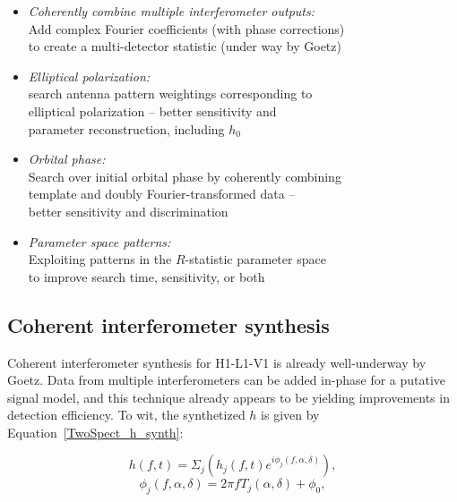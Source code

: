 \begin{itemize}
\item \emph{Coherently combine multiple interferometer outputs: }\\
Add complex Fourier coefficients (with phase corrections)\\
to create a multi-detector statistic (under way by Goetz)
\item \emph{Elliptical polarization:}\\
search antenna pattern weightings corresponding to\\
elliptical polarization -- better sensitivity and\\
parameter reconstruction, including $h_0$
\item \emph{Orbital phase:}\\
Search over initial orbital phase by coherently combining\\
template and doubly Fourier-transformed data --\\
better sensitivity and discrimination
\item \emph{Parameter space patterns:}\\
Exploiting patterns in the $R$-statistic parameter space\\
to improve search time, sensitivity, or both
\end{itemize}



\subsection{Coherent interferometer synthesis}
Coherent interferometer synthesis for H1-L1-V1 is already well-underway by Goetz.
Data from multiple interferometers can be added in-phase for a putative signal model, and this technique already appears to be yielding improvements in detection efficiency.
To wit, the synthetized $h$ is given by Equation~\ref{TwoSpect_h_synth}:

\begin{equation}
h(f,t)=\Sigma_{j}\left(h_{j}(f,t)e^{i\phi_{j}(f,\alpha,\delta)}\right),
\label{TwoSpect_h_synth}
\end{equation}
\begin{equation}
\phi_{j}(f,\alpha,\delta)=2\pi fT_{j}(\alpha,\delta)+\phi_{0},
\label{TwoSpect_phase_synth}
\end{equation}

